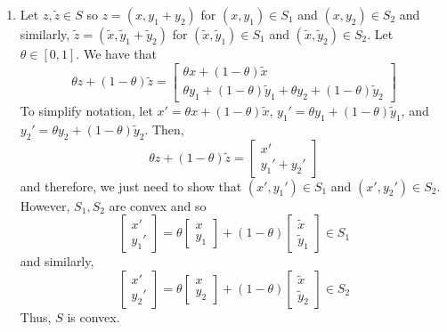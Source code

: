 \documentclass[11pt]{amsart}
\begin{document}
\begin{enumerate}
\vspace{0.5in}
\item Let $z, \tilde{z} \in S$ so $z = (x, y_{1} + y_2)$ for $(x,y_1) \in S_1$ and $(x,y_2)\in S_2$ and similarly, $\tilde{z} = (\tilde{x}, \tilde{y}_1 + \tilde{y}_2)$ for $(\tilde{x}, \tilde{y}_1)\in S_1$ and $(\tilde{x},\tilde{y}_2)\in S_2$.  Let $\theta \in [0,1]$.  We have that
\[
\theta z + (1-\theta)\tilde{z} = \begin{bmatrix} \theta x + (1 - \theta)\tilde{x}\\ \theta y_1 + (1-\theta)\tilde{y}_1 + \theta y_2 + (1-\theta)\tilde{y}_2 \end{bmatrix}
\]
To simplify notation, let $x' = \theta x + (1 - \theta)\tilde{x}$, $y_1' = \theta y_1 + (1-\theta)\tilde{y}_1$, and $y_2' = \theta y_2 + (1-\theta)\tilde{y}_2$.  Then,
\[
\theta z + (1-\theta)\tilde{z} = \begin{bmatrix} x'\\y_1' + y_2' \end{bmatrix}
\]
and therefore, we just need to show that $(x',y_1')\in S_1$ and $(x',y_2')\in S_2$.  However, $S_1,S_2$ are convex and so
\[
\begin{bmatrix} x'\\ y_1'\end{bmatrix} = \theta \begin{bmatrix}x\\ y_1 \end{bmatrix} + (1-\theta)\begin{bmatrix}\tilde{x}\\ \tilde{y}_1 \end{bmatrix} \in S_1
\]
and similarly,
\[
\begin{bmatrix} x'\\ y_2'\end{bmatrix} = \theta \begin{bmatrix}x\\ y_2 \end{bmatrix} + (1-\theta)\begin{bmatrix}\tilde{x}\\ \tilde{y}_2 \end{bmatrix} \in S_2
\]
Thus, $S$ is convex.

\vspace{0.5in}


\end{enumerate}
\end{document}
